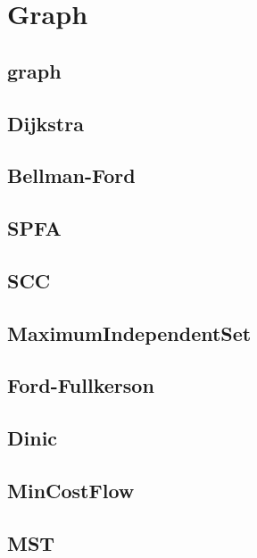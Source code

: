 \section{Graph}

\subsection{graph}


\subsection{Dijkstra}


\subsection{Bellman-Ford}


\subsection{SPFA}


\subsection{SCC}


\subsection{MaximumIndependentSet}


\subsection{Ford-Fullkerson}


\subsection{Dinic}


\subsection{MinCostFlow}


\subsection{MST}

